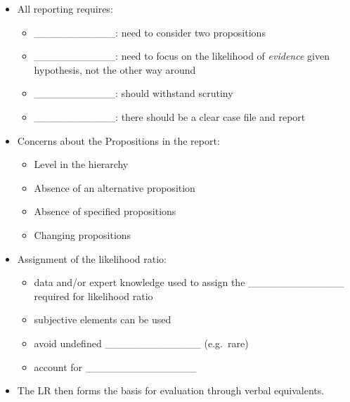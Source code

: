 \documentclass[]{book}
\providecommand{\tightlist}{%
  \setlength{\itemsep}{0pt}\setlength{\parskip}{0pt}}
\theoremstyle{definition}
\theoremstyle{definition}
\theoremstyle{remark}
\begin{document}
\begin{itemize}
\tightlist
\item
  All reporting requires:

  \begin{itemize}
  \tightlist
  \item
    \_\_\_\_\_\_\_\_\_\_\_: need to consider two propositions
    \vspace{.1in}
  \item
    \_\_\_\_\_\_\_\_\_\_\_: need to focus on the likelihood of
    \emph{evidence} given hypothesis, not the other way around
    \vspace{.1in}
  \item
    \_\_\_\_\_\_\_\_\_\_\_: should withstand scrutiny \vspace{.1in}
  \item
    \_\_\_\_\_\_\_\_\_\_\_: there should be a clear case file and report
  \end{itemize}
\item
  Concerns about the Propositions in the report:

  \begin{itemize}
  \tightlist
  \item
    Level in the hierarchy
  \item
    Absence of an alternative proposition
  \item
    Absence of specified propositions
  \item
    Changing propositions
  \end{itemize}
\item
  Assignment of the likelihood ratio:

  \begin{itemize}
  \tightlist
  \item
    data and/or expert knowledge used to assign the
    \_\_\_\_\_\_\_\_\_\_\_\_\_ required for likelihood ratio
    \vspace{.1in}
  \item
    subjective elements can be used \vspace{.1in}
  \item
    avoid undefined \_\_\_\_\_\_\_\_\_\_\_\_\_ (e.g.~rare) \vspace{.1in}
  \item
    account for \_\_\_\_\_\_\_\_\_\_\_\_\_\_\_
  \end{itemize}
\item
  The LR then forms the basis for evaluation through verbal equivalents.
\end{itemize}
\end{document}
